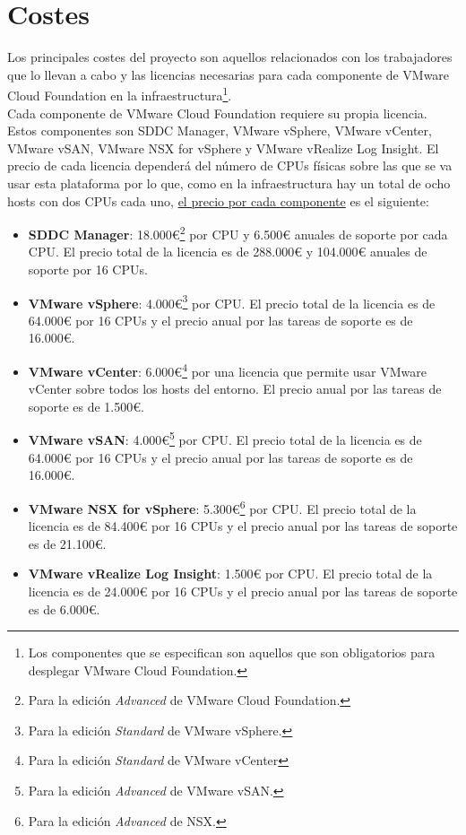 \section{Costes}
Los principales costes del proyecto son aquellos relacionados con los trabajadores que lo llevan a cabo y las licencias necesarias para cada componente de VMware Cloud Foundation en la infraestructura\footnote{Los componentes que se especifican son aquellos que son obligatorios para desplegar VMware Cloud Foundation.}.\\
Cada componente de VMware Cloud Foundation requiere su propia licencia\cite{licenses}. Estos componentes son SDDC Manager, VMware vSphere, VMware vCenter, VMware vSAN, VMware NSX for vSphere y VMware vRealize Log Insight. El precio de cada licencia dependerá del número de CPUs físicas sobre las que se va usar esta plataforma por lo que, como en la infraestructura hay un total de ocho hosts con dos CPUs cada uno, \underline{el precio por cada componente} es el siguiente:
\begin{itemize}
    \item \textbf{SDDC Manager}: 18.000€\footnote{Para la edición \textit{Advanced} de VMware Cloud Foundation.} por CPU y 6.500€ anuales de soporte por cada CPU. El precio total de la licencia es de 288.000€ y 104.000€ anuales de soporte por 16 CPUs.
    \item \textbf{VMware vSphere}: 4.000€\footnote{Para la edición \textit{Standard} de VMware vSphere.} por CPU. El precio total de la licencia es de 64.000€ por 16 CPUs y el precio anual por las tareas de soporte es de 16.000€.
    \item \textbf{VMware vCenter}: 6.000€\footnote{Para la edición \textit{Standard} de VMware vCenter} por una licencia que permite usar VMware vCenter sobre todos los hosts del entorno. El precio anual por las tareas de soporte es de 1.500€.
    \item \textbf{VMware vSAN}: 4.000€\footnote{Para la edición \textit{Advanced} de VMware vSAN.} por CPU. El precio total de la licencia es de 64.000€ por 16 CPUs y el precio anual por las tareas de soporte es de 16.000€.
    \item \textbf{VMware NSX for vSphere}: 5.300€\footnote{Para la edición \textit{Advanced} de NSX.} por CPU. El precio total de la licencia es de 84.400€ por 16 CPUs y el precio anual por las tareas de soporte es de 21.100€.
    \item \textbf{VMware vRealize Log Insight}: 1.500€ por CPU. El precio total de la licencia es de 24.000€ por 16 CPUs y el precio anual por las tareas de soporte es de 6.000€.
\end{itemize}

